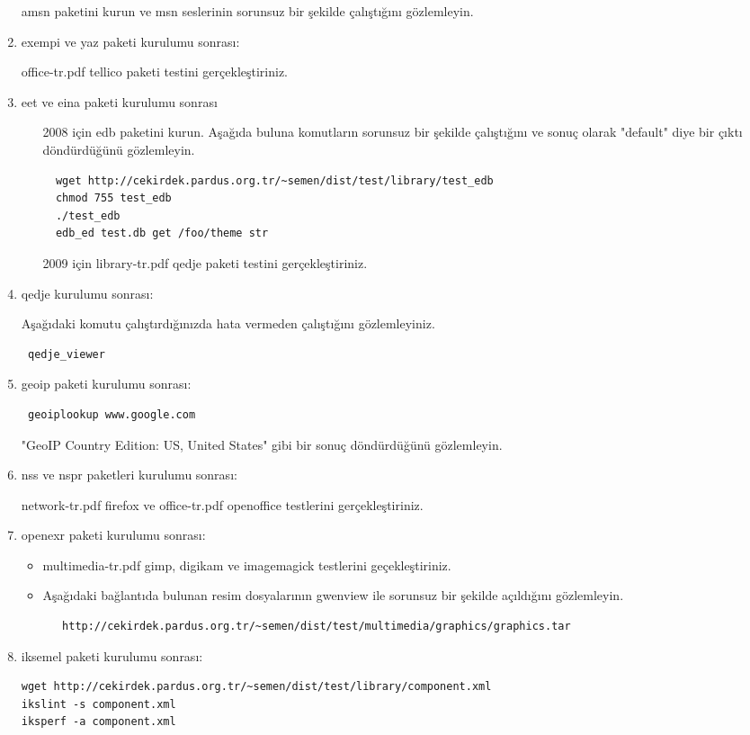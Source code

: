 \documentclass[a4paper,10pt]{article}
\begin{document}
\begin{enumerate}
amsn paketini kurun ve msn seslerinin sorunsuz bir şekilde çalıştığını gözlemleyin.


\item exempi ve yaz paketi kurulumu sonrası:

office-tr.pdf tellico paketi testini gerçekleştiriniz.

\item eet ve eina paketi kurulumu sonrası
\begin{itemize}
 \item [2008 için] edb paketini kurun. Aşağıda buluna komutların sorunsuz bir şekilde çalıştığını ve sonuç olarak "default" diye bir çıktı döndürdüğünü gözlemleyin.
\begin{verbatim}
  wget http://cekirdek.pardus.org.tr/~semen/dist/test/library/test_edb
  chmod 755 test_edb
  ./test_edb
  edb_ed test.db get /foo/theme str
\end{verbatim}
\item [2009 için] library-tr.pdf qedje paketi testini gerçekleştiriniz.
\end{itemize}

\item qedje kurulumu sonrası:

Aşağıdaki komutu çalıştırdığınızda hata vermeden çalıştığını gözlemleyiniz.
\begin{verbatim}
 qedje_viewer
\end{verbatim}

\item geoip paketi kurulumu sonrası:
\begin{verbatim}
 geoiplookup www.google.com 
\end{verbatim}
"GeoIP Country Edition: US, United States" gibi bir sonuç döndürdüğünü gözlemleyin.

\item nss ve nspr paketleri kurulumu sonrası:

network-tr.pdf firefox ve office-tr.pdf openoffice testlerini gerçekleştiriniz.

\item openexr paketi kurulumu sonrası:
\begin{itemize}
 \item multimedia-tr.pdf gimp, digikam ve imagemagick testlerini geçekleştiriniz.
 \item Aşağıdaki bağlantıda bulunan resim dosyalarının gwenview ile sorunsuz bir şekilde açıldığını gözlemleyin.
  \begin{verbatim}
   http://cekirdek.pardus.org.tr/~semen/dist/test/multimedia/graphics/graphics.tar
  \end{verbatim}
\end{itemize}
\item iksemel paketi kurulumu sonrası:
\begin{verbatim}
wget http://cekirdek.pardus.org.tr/~semen/dist/test/library/component.xml
ikslint -s component.xml
iksperf -a component.xml 
\end{verbatim}


\end{enumerate}
\end{document}
